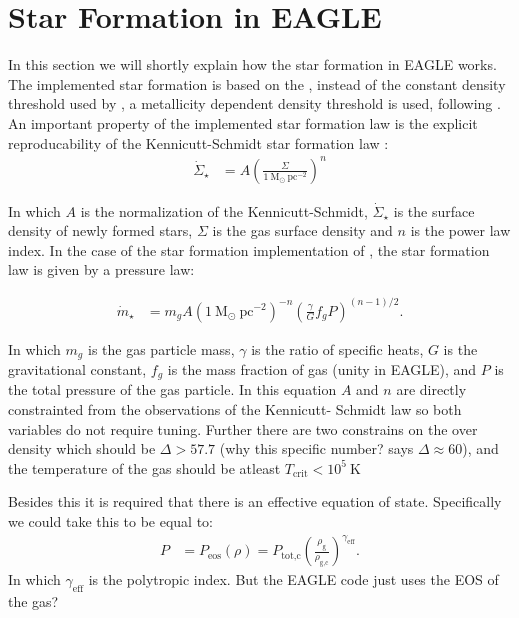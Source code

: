 \section{Star Formation in EAGLE}

In this section we will shortly explain how the star formation in EAGLE works.
The implemented star formation is based on the \citet{schaye2008}, instead of 
the constant density threshold used by \citet{schaye2008}, a metallicity 
dependent density threshold is used, following \citet{schaye2004}. An important 
property of the implemented star formation law is the explicit reproducability 
of the Kennicutt-Schmidt star formation law \citep{kennicutt1998}:
\begin{align}
 \dot{\Sigma}_\star &= A \left( \frac{\Sigma}{1 ~\text{M}_\odot ~\text{pc}^{-2}} \right)^{n}
\end{align}

\noindent In which $A$ is the normalization of the Kennicutt-Schmidt, $\dot{\Sigma}_\star$
is the surface density of newly formed stars, $\Sigma$ is the gas surface 
density and $n$ is the power law index. In the case of the star formation 
implementation of \citet{schaye2008}, the star formation law is given by 
a pressure law:

\begin{align}
\dot{m}_\star &= m_g A ( 1~\text{M}_\odot~\text{pc}^{-2})^{-n} \left( 
\frac{\gamma}{G} f_g P \right)^{(n-1)/2}.
\end{align}

\noindent In which $m_g$ is the gas particle mass, $\gamma$ is the ratio of specific heats,
$G$ is the gravitational constant, $f_g$ is the mass fraction of gas (unity in 
EAGLE), and $P$ is the total pressure of the gas particle. In this equation
$A$ and $n$ are directly constrainted from the observations of the Kennicutt-
Schmidt law so both variables do not require tuning. Further there are 
two constrains on the over density which should be $\Delta > 57.7$ (why this 
specific number? \citet{schaye2008} says $\Delta \approx 60$), and the
temperature of the gas should be atleast $T_\text{crit}<10^5 ~\text{K}$

Besides this it is required that there is an effective equation of state. 
Specifically we could take this to be equal to:
\begin{align}
 P &= P_\text{eos} (\rho) = P_\text{tot,c}\left( \frac{\rho_\text{g}}{\rho_\text{g,c}} \right)^{\gamma_\text{eff}}.
\end{align}
\noindent In which $\gamma_\text{eff}$ is the polytropic index. But the EAGLE 
code just uses the EOS of the gas?

